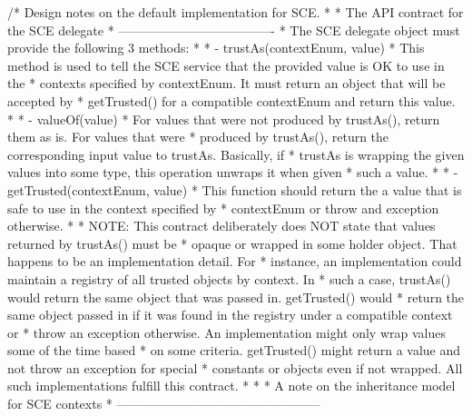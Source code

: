 \begin{DoxyCodeInclude}
{{{{  \textcolor{comment}{/* Design notes on the default implementation for SCE.}
\textcolor{comment}{   *}
\textcolor{comment}{   * The API contract for the SCE delegate}
\textcolor{comment}{   * -------------------------------------}
\textcolor{comment}{   * The SCE delegate object must provide the following 3 methods:}
\textcolor{comment}{   *}
\textcolor{comment}{   * - trustAs(contextEnum, value)}
\textcolor{comment}{   *     This method is used to tell the SCE service that the provided value is OK to use in the}
\textcolor{comment}{   *     contexts specified by contextEnum.  It must return an object that will be accepted by}
\textcolor{comment}{   *     getTrusted() for a compatible contextEnum and return this value.}
\textcolor{comment}{   *}
\textcolor{comment}{   * - valueOf(value)}
\textcolor{comment}{   *     For values that were not produced by trustAs(), return them as is.  For values that were}
\textcolor{comment}{   *     produced by trustAs(), return the corresponding input value to trustAs.  Basically, if}
\textcolor{comment}{   *     trustAs is wrapping the given values into some type, this operation unwraps it when given}
\textcolor{comment}{   *     such a value.}
\textcolor{comment}{   *}
\textcolor{comment}{   * - getTrusted(contextEnum, value)}
\textcolor{comment}{   *     This function should return the a value that is safe to use in the context specified by}
\textcolor{comment}{   *     contextEnum or throw and exception otherwise.}
\textcolor{comment}{   *}
\textcolor{comment}{   * NOTE: This contract deliberately does NOT state that values returned by trustAs() must be}
\textcolor{comment}{   * opaque or wrapped in some holder object.  That happens to be an implementation detail.  For}
\textcolor{comment}{   * instance, an implementation could maintain a registry of all trusted objects by context.  In}
\textcolor{comment}{   * such a case, trustAs() would return the same object that was passed in.  getTrusted() would}
\textcolor{comment}{   * return the same object passed in if it was found in the registry under a compatible context or}
\textcolor{comment}{   * throw an exception otherwise.  An implementation might only wrap values some of the time based}
\textcolor{comment}{   * on some criteria.  getTrusted() might return a value and not throw an exception for special}
\textcolor{comment}{   * constants or objects even if not wrapped.  All such implementations fulfill this contract.}
\textcolor{comment}{   *}
\textcolor{comment}{   *}
\textcolor{comment}{   * A note on the inheritance model for SCE contexts}
\textcolor{comment}{   * ------------------------------------------------}
}}}}
\end{DoxyCodeInclude}
